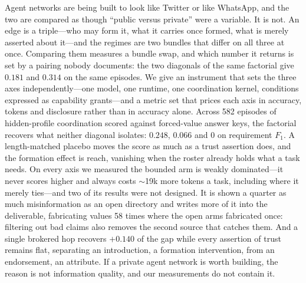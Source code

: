 Agent networks are being built to look like Twitter or like WhatsApp, and the two are
compared as though ``public versus private'' were a variable. It is not. An edge is a
triple---who may form it, what it carries once formed, what is merely asserted about
it---and the regimes are two bundles that differ on all three at once. Comparing them
measures a bundle swap, and which number it returns is set by a pairing nobody documents:
the two diagonals of the same factorial give $0.181$ and $0.314$ on the same episodes. We
give an instrument that sets the three axes independently---one model, one runtime, one
coordination kernel, conditions expressed as capability grants---and a metric set that
prices each axis in accuracy, tokens and disclosure rather than in accuracy alone. Across
582 episodes of hidden-profile coordination scored against forced-value answer keys, the
factorial recovers what neither diagonal isolates: $0.248$, $0.066$ and $0$ on requirement
$F_1$. A length-matched placebo moves the score as much as a trust assertion does, and the
formation effect is reach, vanishing when the roster already holds what a task needs. On
every axis we measured the bounded arm is weakly dominated---it never scores higher and
always costs $\sim$19k more tokens a task, including where it merely ties---and two of its
results were not designed. It is shown a quarter as much misinformation as an open directory
and writes more of it into the deliverable, fabricating values 58 times where the open arms
fabricated once: filtering out bad claims also removes the second source that catches them.
And a single brokered hop recovers $+0.140$ of the gap while every assertion of trust
remains flat, separating an introduction, a formation intervention, from an endorsement, an
attribute. If a private agent network is worth building, the reason is not information
quality, and our measurements do not contain it.
